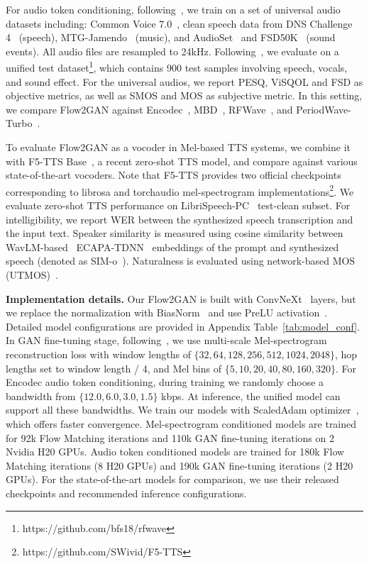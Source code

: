 For audio token conditioning, following~\citep{mbd,rfwave}, we train on a set of universal audio datasets including: Common Voice 7.0~\citep{commonvoice}, clean speech data from DNS Challenge 4~\citep{dns} (speech), MTG-Jamendo~\citep{mtg} (music), and AudioSet~\citep{audioset} and FSD50K~\citep{fsd50k} (sound events). All audio files are resampled to 24kHz. Following~\citep{rfwave}, we evaluate on a unified test dataset\footnote{https://github.com/bfs18/rfwave}, which contains 900 test samples involving speech, vocals, and sound effect. 
For the universal audios, we report PESQ, ViSQOL and FSD as objective metrics, as well as SMOS and MOS as subjective metric. In this setting,  we compare Flow2GAN against Encodec~\citep{encodec}, MBD~\citep{mbd}, RFWave~\citep{rfwave}, and PeriodWave-Turbo~\citep{periodwave_turbo}. 


To evaluate Flow2GAN as a vocoder in Mel-based TTS systems, we combine it with F5-TTS Base~\citep{f5}, a recent zero-shot TTS model, and compare against various state-of-the-art vocoders. Note that F5-TTS provides two official checkpoints corresponding to librosa and torchaudio mel-spectrogram implementations\footnote{https://github.com/SWivid/F5-TTS}. 
We evaluate zero-shot TTS performance on LibriSpeech-PC~\citep{librispeech-pc} test-clean subset. 
For intelligibility, we report WER between the synthesized speech transcription and the input text. Speaker similarity is measured using cosine similarity between WavLM-based~\citep{wavlm} ECAPA-TDNN~\citep{ecapa} embeddings of the prompt and synthesized speech (denoted as SIM-o~\citep{voicebox}). Naturalness is evaluated using network-based MOS (UTMOS)~\citep{utmos}. 

\noindent\textbf{Implementation details.}
Our Flow2GAN is built with ConvNeXt~\citep{convnext} layers, but we replace the normalization with BiasNorm~\citep{zipformer} and use PreLU activation~\citep{prelu}.
Detailed model configurations are provided in Appendix Table~\ref{tab:model_conf}. 
In GAN fine-tuning stage, following~\citep{dac}, we use multi-scale Mel-spectrogram reconstruction loss with window lengths of $\{32, 64, 128, 256, 512, 1024, 2048\}$, hop lengths set to window length / 4, and Mel bins of $\{5, 10, 20, 40, 80, 160, 320\}$.
For Encodec audio token conditioning, during training we randomly choose a bandwidth from $\{12.0, 6.0, 3.0, 1.5\}$ kbps. At inference, the unified model can support all these bandwidths. We train our models with ScaledAdam optimizer~\citep{zipformer}, which offers faster convergence. Mel-spectrogram conditioned models are trained for 92k Flow Matching iterations and 110k GAN fine-tuning iterations on 2 Nvidia H20 GPUs. Audio token conditioned models are trained for 180k Flow Matching iterations (8 H20 GPUs) and 190k GAN fine-tuning iterations (2 H20 GPUs). For the state-of-the-art models for comparison, we use their released checkpoints and recommended inference configurations.

